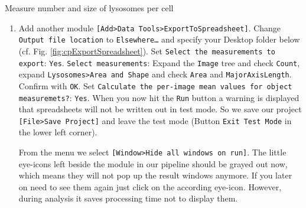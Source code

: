 \begin{taskbox}{Measure number and size of lysosomes per cell}
\begin{enumerate}
\item Add another module \texttt{[Add>Data Tools>ExportToSpreadsheet]}. Change \newline 
\texttt{Output file location} to \texttt{Elsewhere…} and specify your Desktop folder below (cf. Fig. \ref{fig:cpExportSpreadsheet}).\newline 
Set \texttt{Select the measurements to export}: \texttt{Yes}.\newline
\texttt{Select measurements}: Expand the \texttt{Image} tree and check \texttt{Count}, expand \texttt{Lysosomes>Area and Shape} and
check \texttt{Area} and \texttt{MajorAxisLength}. \newline
Confirm with \texttt{OK}.\newline
Set \newline
\texttt{Calculate the per-image mean values for object measuremets?}: \texttt{Yes}.\newline
When you now hit the \texttt{Run} button a warning is displayed that spreadsheets will not be written out in test mode.
So we save our project \texttt{[File>Save Project]} and leave the test mode (Button \texttt{Exit Test Mode} in the lower
left corner). 
	\begin{minipage}[t]{\linewidth}
		\begin{center}
		\medskip
		\label{fig:cpExportSpreadsheet}
		\end{center}
	\end{minipage}

From the menu we select \texttt{[Window>Hide all windows on run]}. The little eye-icons left beside
the module in our pipeline should be grayed out now, which means they will not pop up the result
windows anymore. If you later on need to see them again just click on the according eye-icon. However,
during analysis it saves processing time not to display them. 


\end{enumerate}
\end{taskbox}
